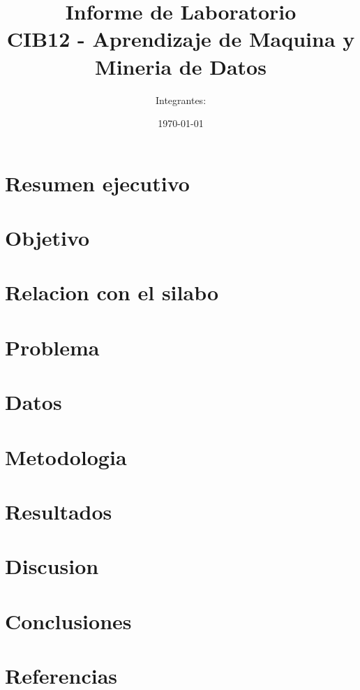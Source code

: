 \documentclass[11pt,a4paper]{article}
\title{Informe de Laboratorio\\CIB12 - Aprendizaje de Maquina y Mineria de Datos}
\author{Integrantes:}
\date{\today}
\begin{document}
\maketitle

\section{Resumen ejecutivo}

\section{Objetivo}

\section{Relacion con el silabo}

\section{Problema}

\section{Datos}

\section{Metodologia}

\section{Resultados}

\section{Discusion}

\section{Conclusiones}

\section{Referencias}
\end{document}
